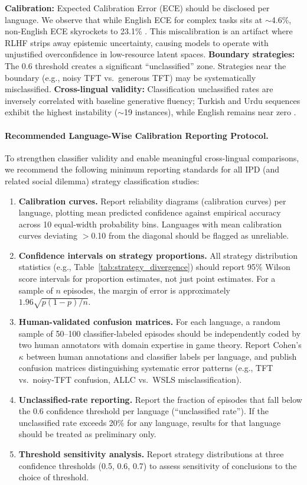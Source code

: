 \documentclass[11pt]{article}
\begin{document}
\noindent \textbf{Calibration:} Expected Calibration Error (ECE) should be disclosed per language. We observe that while English ECE for complex tasks sits at $\sim$4.6\%, non-English ECE skyrockets to 23.1\% \citep{zhou2025beyond}. This miscalibration is an artifact where RLHF strips away epistemic uncertainty, causing models to operate with unjustified overconfidence in low-resource latent spaces. \textbf{Boundary strategies:} The 0.6 threshold creates a significant ``unclassified'' zone. Strategies near the boundary (e.g., noisy TFT vs.\ generous TFT) may be systematically misclassified. \textbf{Cross-lingual validity:} Classification unclassified rates are inversely correlated with baseline generative fluency; Turkish and Urdu sequences exhibit the highest instability ($\sim$19 instances), while English remains near zero \citep{huynh2026moreatstake}.

\paragraph{Recommended Language-Wise Calibration Reporting Protocol.}
To strengthen classifier validity and enable meaningful cross-lingual comparisons, we recommend the following minimum reporting standards for all IPD (and related social dilemma) strategy classification studies:

\begin{enumerate}[leftmargin=1.5em,itemsep=2pt]
\item \textbf{Calibration curves.} Report reliability diagrams (calibration curves) per language, plotting mean predicted confidence against empirical accuracy across 10 equal-width probability bins. Languages with mean calibration curves deviating $>$0.10 from the diagonal should be flagged as unreliable.
\item \textbf{Confidence intervals on strategy proportions.} All strategy distribution statistics (e.g., Table~\ref{tab:strategy_divergence}) should report 95\% Wilson score intervals for proportion estimates, not just point estimates. For a sample of $n$ episodes, the margin of error is approximately $1.96\sqrt{p(1{-}p)/n}$.
\item \textbf{Human-validated confusion matrices.} For each language, a random sample of 50--100 classifier-labeled episodes should be independently coded by two human annotators with domain expertise in game theory. Report Cohen's $\kappa$ between human annotations and classifier labels per language, and publish confusion matrices distinguishing systematic error patterns (e.g., TFT vs.\ noisy-TFT confusion, ALLC vs.\ WSLS misclassification).
\item \textbf{Unclassified-rate reporting.} Report the fraction of episodes that fall below the 0.6 confidence threshold per language (``unclassified rate''). If the unclassified rate exceeds 20\% for any language, results for that language should be treated as preliminary only.
\item \textbf{Threshold sensitivity analysis.} Report strategy distributions at three confidence thresholds (0.5, 0.6, 0.7) to assess sensitivity of conclusions to the choice of threshold.
\end{enumerate}
\end{document}
